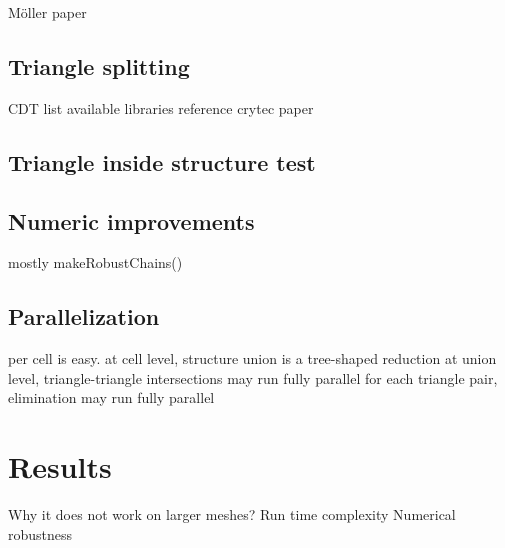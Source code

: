 Möller paper
	
\subsection{Triangle splitting}
\label{sec:triangle_splitting}

CDT
list available libraries
reference crytec paper

\subsection{Triangle inside structure test}
\label{sec:triangle_inside_test}



\subsection{Numeric improvements}
\label{sec:numeric_improvements}

mostly makeRobustChains()


\subsection{Parallelization}
\label{sec:parallelization}


per cell is easy.
at cell level, structure union is a tree-shaped reduction
at union level, triangle-triangle intersections may run fully parallel for each triangle pair, elimination may run fully parallel




\section{Results}
\label{sec:direct_intersection_results}

Why it does not work on larger meshes?
Run time complexity
Numerical robustness


